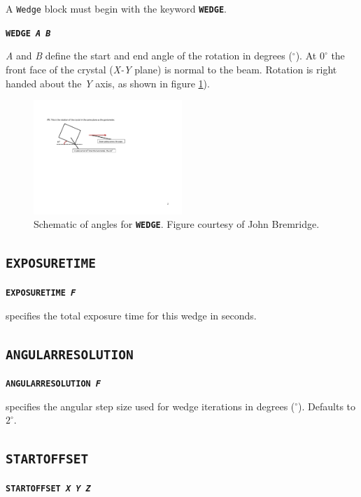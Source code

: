 \documentclass[a4paper]{article}
\newcommand{\Class}[1]{\texttt{#1}\xspace}
\newcommand{\Keyword}[1]{\texttt{\textbf{#1}}\xspace}
\begin{document}
A \Class{Wedge} block must begin with the keyword \Keyword{WEDGE}.

\Keyword{WEDGE \textit{A B}}

\textit{A} and \textit{B} define the start and end angle of the rotation in degrees ($^\circ$). At $0^\circ$ the front face of the crystal (\textit{X-Y} plane) is normal to the beam. Rotation is right handed about the \textit{Y} axis, as shown in figure \ref{fig:anglePhi}).
\begin{figure}[h!]
\centering
\includegraphics[width=0.5\textwidth]{Figs-for-Markus-from-JB-19-5-13-3.pdf}
\caption{Schematic of angles for \Keyword{WEDGE}. Figure courtesy of John Bremridge.}
\label{fig:anglePhi}
\end{figure}

\subsection{\Keyword{EXPOSURETIME}}

\noindent \Keyword{EXPOSURETIME \textit{F}}

specifies the total exposure time for this wedge in seconds.



\subsection{\Keyword{ANGULARRESOLUTION}}

\noindent \Keyword{ANGULARRESOLUTION \textit{F}}

specifies the angular step size used for wedge iterations in degrees ($^\circ$). Defaults to $2^\circ$.



\subsection{\Keyword{STARTOFFSET}}

\noindent \Keyword{STARTOFFSET \textit{X Y Z}}
\end{document}

